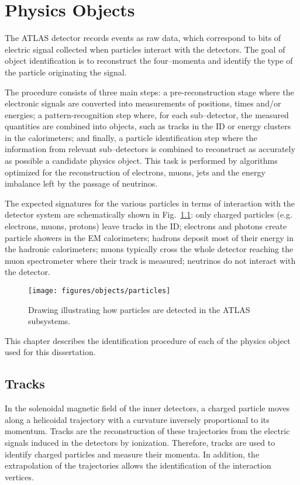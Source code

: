 \chapter{Physics Objects}
\label{sec:objects}

The ATLAS detector records events as raw data, 
which correspond to bits of electric signal collected 
when particles interact with the detectors. 
The goal of object identification is to reconstruct the four--momenta
and identify the type of the particle originating the signal.

The procedure consists of three main steps: a pre-reconstruction stage
where the electronic signals are converted into measurements of
positions, times and/or energies; a pattern-recognition step where, for each
sub--detector, the measured quantities are combined into objects, such
as tracks in the ID or energy clusters in the calorimeters; and
finally, a particle
identification step where the information from relevant sub--detectors
is combined to reconstruct as accurately as possible a candidate
physics object. This task is performed by algorithms optimized for the
reconstruction of electrons, muons, jets and the energy imbalance left
by the passage of neutrinos. 

The expected signatures for the various particles in terms of
interaction with the detector system are schematically shown in
Fig.~\ref{fig:decaychart}: only charged particles (e.g. electrons,
muons, protons) leave tracks in the ID; electrons and photons create
particle showers in the EM calorimeters; hadrons deposit most of their
energy in the hadronic calorimeters; muons typically cross the whole
detector reaching the muon spectrometer where their track is measured;
neutrinos do not interact with the detector.
\begin{figure}[tb]\centering
  \texttt{[image: figures/objects/particles]}
  \caption{Drawing illustrating how particles are detected in the ATLAS subsystems.}
  \label{fig:decaychart}
\end{figure}
This chapter describes the identification procedure of each of the
physics object used for this dissertation.

\section{Tracks}
\label{sec:tracks}

In the solenoidal magnetic field of the inner detectors,
a charged particle moves along a helicoidal trajectory with a 
curvature inversely proportional to its momentum.
Tracks are the reconstruction of these trajectories from the electric 
signals induced in the detectors by ionization.
Therefore, tracks are used to identify charged particles and measure
their momenta. In addition, the extrapolation of the trajectories
allows the identification of the interaction vertices.
 
